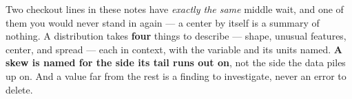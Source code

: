 \documentclass[12pt]{article}
\begin{document}
\vspace{0.14in}

\boxguard[8]
\begin{remindbox}
\small
Two checkout lines in these notes have \emph{exactly the same} middle wait, and one of them you
would never stand in again --- a center by itself is a summary of nothing. A distribution takes
\textbf{four} things to describe --- shape, unusual features, center, and spread --- each in
context, with the variable and its units named. \textbf{A skew is named for the side its tail
runs out on}, not the side the data piles up on. And a value far from the rest is a finding to
investigate, never an error to delete.
\end{remindbox}
\end{document}
